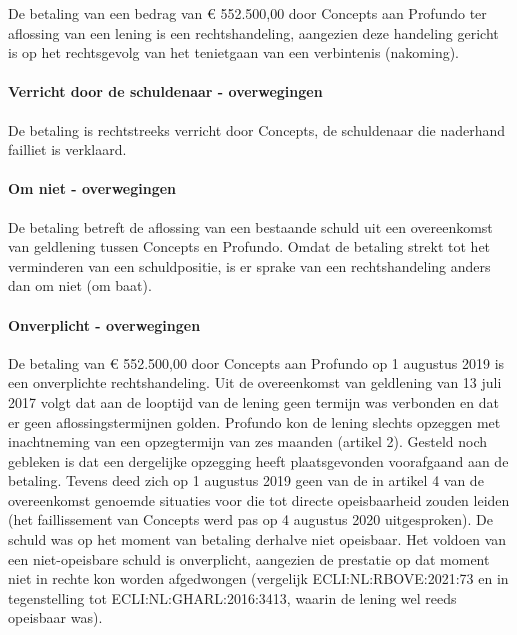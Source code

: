 \documentclass[
  dutch,
  a4paper,
]{article}
\begin{document}
De betaling van een bedrag van € 552.500,00 door Concepts aan Profundo ter aflossing van een lening is een rechtshandeling, aangezien deze handeling gericht is op het rechtsgevolg van het tenietgaan van een verbintenis (nakoming).

\paragraph{Verricht door de schuldenaar - overwegingen}\label{verricht-door-de-schuldenaar---overwegingen-41}

De betaling is rechtstreeks verricht door Concepts, de schuldenaar die naderhand failliet is verklaard.

\paragraph{Om niet - overwegingen}\label{om-niet---overwegingen-41}

De betaling betreft de aflossing van een bestaande schuld uit een overeenkomst van geldlening tussen Concepts en Profundo. Omdat de betaling strekt tot het verminderen van een schuldpositie, is er sprake van een rechtshandeling anders dan om niet (om baat).

\paragraph{Onverplicht - overwegingen}\label{onverplicht---overwegingen-41}

De betaling van € 552.500,00 door Concepts aan Profundo op 1 augustus 2019 is een onverplichte rechtshandeling. Uit de overeenkomst van geldlening van 13 juli 2017 volgt dat aan de looptijd van de lening geen termijn was verbonden en dat er geen aflossingstermijnen golden. Profundo kon de lening slechts opzeggen met inachtneming van een opzegtermijn van zes maanden (artikel 2). Gesteld noch gebleken is dat een dergelijke opzegging heeft plaatsgevonden voorafgaand aan de betaling. Tevens deed zich op 1 augustus 2019 geen van de in artikel 4 van de overeenkomst genoemde situaties voor die tot directe opeisbaarheid zouden leiden (het faillissement van Concepts werd pas op 4 augustus 2020 uitgesproken). De schuld was op het moment van betaling derhalve niet opeisbaar. Het voldoen van een niet-opeisbare schuld is onverplicht, aangezien de prestatie op dat moment niet in rechte kon worden afgedwongen (vergelijk ECLI:NL:RBOVE:2021:73 en in tegenstelling tot ECLI:NL:GHARL:2016:3413, waarin de lening wel reeds opeisbaar was).
\end{document}
